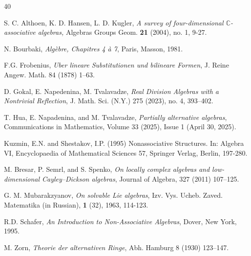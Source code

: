 \documentclass{amsart}
\theoremstyle{definition}
\theoremstyle{plain}
\begin{document}
\begin{thebibliography}{40}

 S. C. Althoen, K. D. Hansen, L. D. Kugler, {\em A survey of four-dimensional $\mathbb C$-associative algebras, } Algebras Groups Geom. {\bf 21} (2004), no. 1, 9-27.

 N. Bourbaki, {\em Algèbre, Chapitres 4 à 7}, Paris, Masson, 1981.

 F.G. Frobenius, {\em Uber lineare Substitutionen und bilineare Formen}, J. Reine Angew. Math. 84 (1878) 1–63.

 D. Gokal, E. Napedenina,  M. Tvalavadze, {\em Real Division Algebras with a Nontrivial Reflection}, J. Math. Sci. (N.Y.) 275 (2023), no. 4, 393–402.

 T. Hua, E. Napadenina, and M. Tvalavadze, {\em Partially alternative algebras}, 
Communications in Mathematics, Volume 33 (2025), Issue 1 (April 30, 2025).

 Kuzmin, E.N. and Shestakov, I.P. (1995) Nonassociative Structures. In: Algebra VI, Encyclopaedia of Mathematical Sciences 57, Springer Verlag, Berlin, 197-280.

 M. Bresar, P. Semrl, and S. Spenko, {\em On locally complex algebras and low-dimensional
Cayley–Dickson algebras}, Journal of Algebra, 327 (2011) 107–125.

 G. M. Mubarakzyanov, {\em On solvable Lie algebras}, Izv. Vys. Ucheb. Zaved. Matematika (in Russian), {\bf 1} (32), 1963, 114-123.

 R.D. Schafer, {\em An Introduction to Non-Associative Algebras}, Dover, New York, 1995.

 M. Zorn, {\em Theorie der alternativen Ringe}, Abh. Hamburg 8 (1930) 123–147.
\end{thebibliography}
\end{document}
